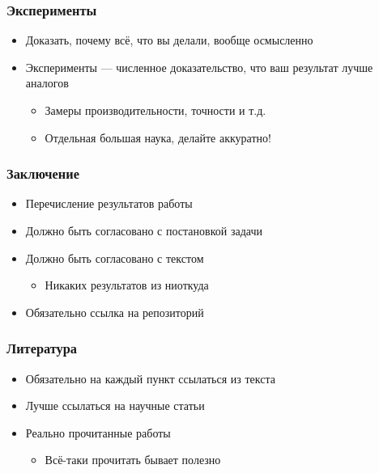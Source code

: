 \documentclass{../../slides-style}
\begin{document}
    \begin{frame}
        \frametitle{Эксперименты}
        \begin{itemize}
            \item Доказать, почему всё, что вы делали, вообще осмысленно
            \item Эксперименты --- численное доказательство, что ваш результат лучше аналогов
            \begin{itemize}
                \item Замеры производительности, точности и т.д.
                \item Отдельная большая наука, делайте аккуратно!
            \end{itemize}
        \end{itemize}
    \end{frame}

    \begin{frame}
        \frametitle{Заключение}
        \begin{itemize}
            \item Перечисление результатов работы
            \item Должно быть согласовано с постановкой задачи
            \item Должно быть согласовано с текстом
            \begin{itemize}
                \item Никаких результатов из ниоткуда
            \end{itemize}
            \item Обязательно ссылка на репозиторий
        \end{itemize}
    \end{frame}

    \begin{frame}
        \frametitle{Литература}
        \begin{itemize}
            \item Обязательно на каждый пункт ссылаться из текста
            \item Лучше ссылаться на научные статьи
            \item Реально прочитанные работы
            \begin{itemize}
                \item Всё-таки прочитать бывает полезно
            \end{itemize}
        \end{itemize}
    \end{frame}
\end{document}
